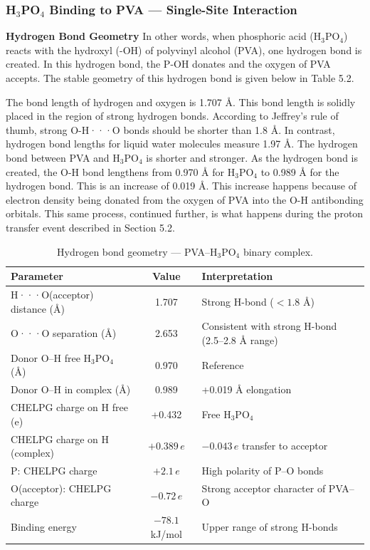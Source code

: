 \documentclass[12pt,a4paper]{report}
\begin{document}
\subsubsection{H\(_3\)PO\(_4\) Binding to PVA — Single-Site Interaction}

\textbf{Hydrogen Bond Geometry}
In other words, when phosphoric acid (H\(_3\)PO\(_4\)) reacts with the hydroxyl (-OH) of polyvinyl alcohol (PVA), one hydrogen bond is created. In this hydrogen bond, the P-OH donates and the oxygen of PVA accepts. The stable geometry of this hydrogen bond is given below in Table 5.2.

The bond length of hydrogen and oxygen is 1.707 Å. This bond length is solidly placed in the region of strong hydrogen bonds. According to Jeffrey’s rule of thumb, strong O-H···O bonds should be shorter than 1.8 Å. In contrast,\cite{97} hydrogen bond lengths for liquid water molecules measure 1.97 Å. The hydrogen bond between PVA and H\(_3\)PO\(_4\) is shorter and stronger. As the hydrogen bond is created, the O-H bond lengthens from 0.970 Å for H\(_3\)PO\(_4\) to 0.989 Å for the hydrogen bond. This is an increase of 0.019 Å. This increase happens because of electron density being donated from the oxygen of PVA into the O-H antibonding orbitals.\cite{97,98} This same process, continued further, is what happens during the proton transfer event described in Section 5.2.

\begin{table}[h!]
\centering
\caption{Hydrogen bond geometry — PVA–H\(_3\)PO\(_4\) binary complex.}
\label{tab:hbond-geometry}
\begin{tabular}{l c l}
\toprule
Parameter & Value & Interpretation \\
\midrule
H···O(acceptor) distance (Å) & 1.707 & Strong H-bond ($<1.8$ Å) \\
O···O separation (Å) & 2.653 & Consistent with strong H-bond (2.5–2.8 Å range) \\
Donor O–H free H\(_3\)PO\(_4\) (Å) & 0.970 & Reference \\
Donor O–H in complex (Å) & 0.989 & +0.019 Å elongation \\
CHELPG charge on H free (e) & +0.432 & Free H\(_3\)PO\(_4\) \\
CHELPG charge on H (complex) & $+0.389\,e$ & $-0.043\,e$ transfer to acceptor \\
P: CHELPG charge & $+2.1\,e$ & High polarity of P–O bonds \\
O(acceptor): CHELPG charge & $-0.72\,e$ & Strong acceptor character of PVA–O \\
Binding energy & $-78.1$ kJ/mol & Upper range of strong H-bonds \\
\bottomrule
\end{tabular}
\end{table}
\end{document}
